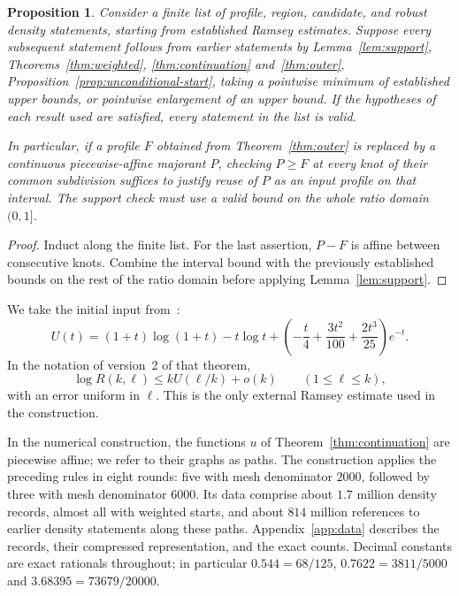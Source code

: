 \documentclass[11pt]{article}
\newtheorem{proposition}[theorem]{Proposition}
\theoremstyle{definition}
\theoremstyle{remark}
\numberwithin{equation}{section}
\begin{document}
\begin{proposition}\label{prop:composition}
Consider a finite list of profile, region, candidate, and robust density statements, starting from established Ramsey estimates. Suppose every subsequent statement follows from earlier statements by Lemma~\ref{lem:support}, Theorems~\ref{thm:weighted}, \ref{thm:continuation} and~\ref{thm:outer}, Proposition~\ref{prop:unconditional-start}, taking a pointwise minimum of established upper bounds, or pointwise enlargement of an upper bound. If the hypotheses of each result used are satisfied, every statement in the list is valid.

In particular, if a profile $F$ obtained from Theorem~\ref{thm:outer} is replaced by a continuous piecewise-affine majorant $P$, checking $P\ge F$ at every knot of their common subdivision suffices to justify reuse of $P$ as an input profile on that interval. The support check must use a valid bound on the whole ratio domain $(0,1]$.
\end{proposition}
\begin{proof}
Induct along the finite list. For the last assertion, $P-F$ is affine between consecutive knots. Combine the interval bound with the previously established bounds on the rest of the ratio domain before applying Lemma~\ref{lem:support}.
\end{proof}

We take the initial input from~\cite[Theorem 1]{GNNW}:
\begin{equation}\label{eq:U}
 U(t)=(1+t)\log(1+t)-t\log t
 +\left(-\frac t4+\frac{3t^2}{100}+\frac{2t^3}{25}\right)e^{-t}.
\end{equation}
In the notation of version~2 of that theorem,
\[
 \log R(k,\ell)\le kU(\ell/k)+o(k)
 \qquad(1\le\ell\le k),
\]
with an error uniform in $\ell$. This is the only external Ramsey
estimate used in the construction.

In the numerical construction, the functions $u$ of
Theorem~\ref{thm:continuation} are piecewise affine; we refer to their
graphs as paths. The construction applies the preceding rules in eight
rounds: five with mesh denominator $2000$, followed by three with mesh
denominator $6000$. Its data comprise about $1.7$ million density
records, almost all with weighted starts, and about $814$ million
references to earlier density statements along these paths.
Appendix~\ref{app:data} describes the records, their compressed
representation, and the exact counts.
Decimal constants are exact rationals throughout; in particular
$0.544=68/125$, $0.7622=3811/5000$ and $3.68395=73679/20000$.
\end{document}
